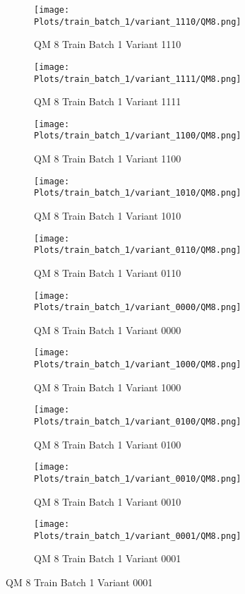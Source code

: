\documentclass{DissertateFigs}
\begin{document}
\begin{figure}[t!]
    \begin{subfigure}{0.38\textwidth}
    \texttt{[image: Plots/train\_batch\_1/variant\_1110/QM8.png]}
    \caption{QM 8 Train Batch 1 Variant 1110}
    \end{subfigure}
    \begin{subfigure}{0.38\textwidth}
    \texttt{[image: Plots/train\_batch\_1/variant\_1111/QM8.png]}
    \caption{QM 8 Train Batch 1 Variant 1111}
    \end{subfigure}

\medskip

    \begin{subfigure}{0.38\textwidth}
    \texttt{[image: Plots/train\_batch\_1/variant\_1100/QM8.png]}
    \caption{QM 8 Train Batch 1 Variant 1100}
    \end{subfigure}
    \begin{subfigure}{0.38\textwidth}
    \texttt{[image: Plots/train\_batch\_1/variant\_1010/QM8.png]}
    \caption{QM 8 Train Batch 1 Variant 1010}
    \end{subfigure}

\medskip

    \begin{subfigure}{0.38\textwidth}
    \texttt{[image: Plots/train\_batch\_1/variant\_0110/QM8.png]}
    \caption{QM 8 Train Batch 1 Variant 0110}
    \end{subfigure}
    \begin{subfigure}{0.38\textwidth}
    \texttt{[image: Plots/train\_batch\_1/variant\_0000/QM8.png]}
    \caption{QM 8 Train Batch 1 Variant 0000}
    \end{subfigure}

\medskip

    \begin{subfigure}{0.38\textwidth}
    \texttt{[image: Plots/train\_batch\_1/variant\_1000/QM8.png]}
    \caption{QM 8 Train Batch 1 Variant 1000}
    \end{subfigure}
    \begin{subfigure}{0.38\textwidth}
    \texttt{[image: Plots/train\_batch\_1/variant\_0100/QM8.png]}
    \caption{QM 8 Train Batch 1 Variant 0100}
    \end{subfigure}

\medskip

    \begin{subfigure}{0.38\textwidth}
    \texttt{[image: Plots/train\_batch\_1/variant\_0010/QM8.png]}
    \caption{QM 8 Train Batch 1 Variant 0010}
    \end{subfigure}
    \begin{subfigure}{0.38\textwidth}
    \texttt{[image: Plots/train\_batch\_1/variant\_0001/QM8.png]}
    \caption{QM 8 Train Batch 1 Variant 0001}
    \end{subfigure}


\end{figure}
\end{document}
